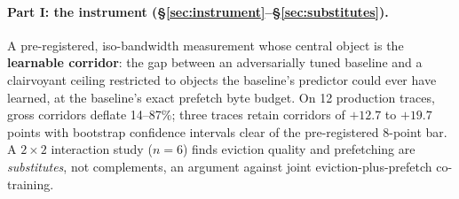 \documentclass[11pt]{article}
\begin{document}
\paragraph{Part I: the instrument (\S\ref{sec:instrument}--\S\ref{sec:substitutes}).} A pre-registered, iso-bandwidth measurement whose central object is the \textbf{learnable corridor}: the gap between an adversarially tuned baseline and a clairvoyant ceiling restricted to objects the baseline's predictor could ever have learned, at the baseline's exact prefetch byte budget. On 12 production traces, gross corridors deflate 14--87\%; three traces retain corridors of $+12.7$ to $+19.7$ points with bootstrap confidence intervals clear of the pre-registered 8-point bar. A $2\times2$ interaction study ($n{=}6$) finds eviction quality and prefetching are \emph{substitutes}, not complements, an argument against joint eviction-plus-prefetch co-training.
\end{document}
